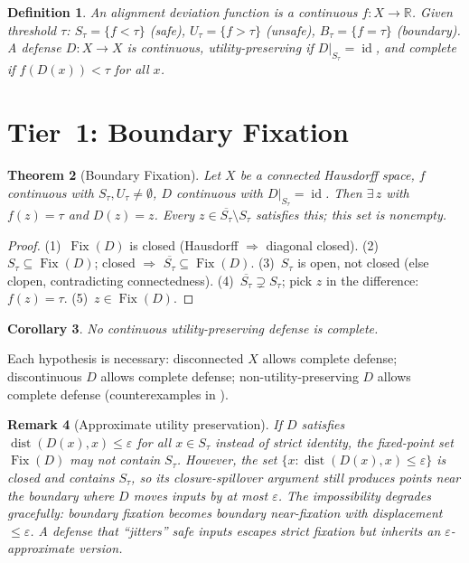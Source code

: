 \documentclass[11pt]{article}
\newtheorem{theorem}{Theorem}[section]
\newtheorem{corollary}[theorem]{Corollary}
\newtheorem{definition}[theorem]{Definition}
\newtheorem{remark}[theorem]{Remark}
\newcommand{\R}{\mathbb{R}}
\newcommand{\cl}[1]{\overline{#1}}
\newcommand{\Fix}{\operatorname{Fix}}
\newcommand{\id}{\operatorname{id}}
\newcommand{\dist}{\operatorname{dist}}
\begin{document}
\begin{definition}
An \emph{alignment deviation function} is a continuous $f\colon X \to \R$. Given threshold $\tau$: $S_\tau = \{f < \tau\}$ (safe), $U_\tau = \{f > \tau\}$ (unsafe), $B_\tau = \{f = \tau\}$ (boundary). A \emph{defense} $D\colon X \to X$ is continuous, \emph{utility-preserving} if $D|_{S_\tau} = \id$, and \emph{complete} if $f(D(x)) < \tau$ for all $x$.
\end{definition}

\section{Tier~1: Boundary Fixation}
\label{sec:proof}

\begin{theorem}[Boundary Fixation]
\label{thm:main}
Let $X$ be a connected Hausdorff space, $f$ continuous with $S_\tau, U_\tau \neq \emptyset$, $D$ continuous with $D|_{S_\tau} = \id$. Then $\exists\, z$ with $f(z) = \tau$ and $D(z) = z$. Every $z \in \cl{S_\tau} \setminus S_\tau$ satisfies this; this set is nonempty.
\end{theorem}

\begin{proof}
(1)~$\Fix(D)$ is closed (Hausdorff $\Rightarrow$ diagonal closed). (2)~$S_\tau \subseteq \Fix(D)$; closed $\Rightarrow$ $\cl{S_\tau} \subseteq \Fix(D)$. (3)~$S_\tau$ is open, not closed (else clopen, contradicting connectedness). (4)~$\cl{S_\tau} \supsetneq S_\tau$; pick $z$ in the difference: $f(z) = \tau$. (5)~$z \in \Fix(D)$.
\end{proof}

\begin{corollary}
No continuous utility-preserving defense is complete.
\end{corollary}

Each hypothesis is necessary: disconnected $X$ allows complete defense; discontinuous $D$ allows complete defense; non-utility-preserving $D$ allows complete defense (counterexamples in ).

\begin{remark}[Approximate utility preservation]
\label{rem:approx}
If $D$ satisfies $\dist(D(x), x) \leq \varepsilon$ for all $x \in S_\tau$ instead of strict identity, the fixed-point set $\Fix(D)$ may not contain $S_\tau$. However, the set $\{x : \dist(D(x), x) \leq \varepsilon\}$ is closed and contains $S_\tau$, so its closure-spillover argument still produces points near the boundary where $D$ moves inputs by at most $\varepsilon$. The impossibility degrades gracefully: boundary fixation becomes boundary \emph{near}-fixation with displacement $\leq \varepsilon$. A defense that ``jitters'' safe inputs escapes strict fixation but inherits an $\varepsilon$-approximate version.
\end{remark}
\end{document}
